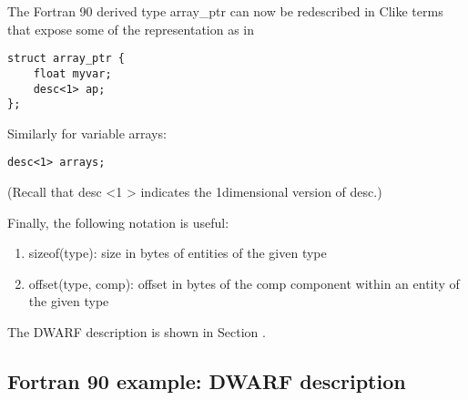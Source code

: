 The Fortran 90 derived type array\_ptr can now be redescribed
in C\dash like terms that expose some of the representation as in

\begin{lstlisting}
struct array_ptr {
    float myvar;
    desc<1> ap;
};
\end{lstlisting}

Similarly for variable arrays:
\begin{lstlisting}
desc<1> arrays;
\end{lstlisting}

(Recall that desc \textless 1 \textgreater 
indicates the 1\dash dimensional version of desc.)

Finally, the following notation is useful:

\begin{enumerate}[1.]
\item  sizeof(type): size in bytes of entities of the given type

\item offset(type, comp): offset in bytes of the comp component
within an entity of the given type
\end{enumerate}


The DWARF description is shown in 
Section .

\subsection{Fortran 90 example: DWARF description}
\label{app:fortran90exampledwarfdescription}

